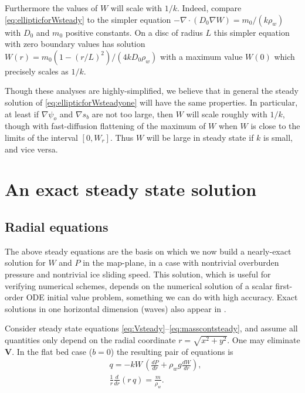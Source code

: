 \documentclass[gmd]{copernicus}   %
\newcommand\bV{\mathbf{V}}
\newcommand{\Div}{\nabla\cdot}
\newcommand{\grad}{\nabla}
\begin{document}
Furthermore the values of $W$ will scale with $1/k$.  Indeed, compare \eqref{eq:ellipticforWsteady} to the simpler equation $-\Div \left(D_0 \grad W\right) = m_0/(k \rho_w)$ with $D_0$ and $m_0$ positive constants.  On a disc of radius $L$ this simpler equation with zero boundary values has solution $W(r) = m_0 (1-(r/L)^2) / (4 k D_0 \rho_w)$ with a maximum value $W(0)$ which precisely scales as $1/k$.

Though these analyses are highly-simplified, we believe that in general the steady solution of \eqref{eq:ellipticforWsteadyone} will have the same properties.  In particular, at least if $\grad \psi_o$ and $\grad s_b$ are not too large, then $W$ will scale roughly with $1/k$, though with fast-diffusion flattening of the maximum of $W$ when $W$ is close to the limits of the interval $[0,W_r]$.  Thus $W$ will be large in steady state if $k$ is small, and vice versa.


\section{An exact steady state solution}  \label{sec:exactsolution}

\subsection{Radial equations}  The above steady equations are the basis on which we now build a nearly-exact solution for $W$ and $P$ in the map-plane, in a case with nontrivial overburden pressure and nontrivial ice sliding speed.  This solution, which is useful for verifying numerical schemes, depends on the numerical solution of a scalar first-order ODE initial value problem, something we can do with high accuracy.  Exact solutions in one horizontal dimension (waves) also appear in \cite{Schoofetal2012}.

Consider steady state equations \eqref{eq:Vsteady}--\eqref{eq:masscontsteady}, and assume all quantities only depend on the radial coordinate $r = \sqrt{x^2+y^2}$.  One may eliminate $\bV$.  In the flat bed case ($b=0$) the resulting pair of equations is
\begin{align}
&q = - k W\, \left(\frac{dP}{dr} + \rho_w g \frac{dW}{dr}\right), \label{eq:rsflux} \\
&\frac{1}{r}\frac{d}{dr}\left(r\,q\right) = \frac{m}{\rho_w}. \label{eq:rsconserve}
\end{align}
\end{document}
